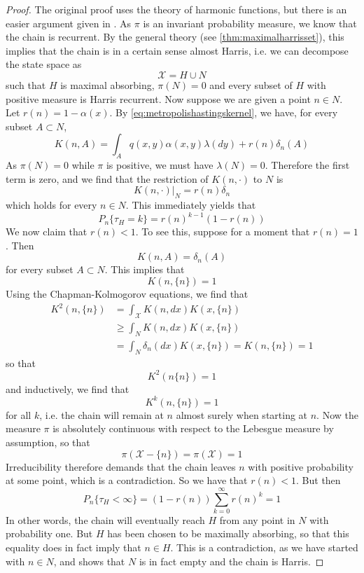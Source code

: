 \documentclass[a4paper, draft]{article}
\theoremstyle{own}
\theoremstyle{remark}
\begin{document}
\begin{proof}
	The original proof uses the theory of harmonic functions, but there is an easier argument given in \cite{RobertsRosenthal2006}. As $\pi$ is an invariant probability measure, we know that the chain is recurrent. By the general theory (see \ref{thm:maximalharrisset}), this implies that the chain is in a certain sense almost Harris, i.e. we can decompose the state space as
	$$
	{\mathcal X} = H \cup N
	$$
	such that $H$ is maximal absorbing, $\pi(N) = 0$ and  every subset of $H$ with positive measure is Harris recurrent. Now suppose we are given a point $n \in N$. Let $r(n) = 1 - \alpha(x)$. By \eqref{eq:metropolishastingskernel}, we have, for every subset $A \subset N$,
	$$
	K(n, A) = \int_A q(x,y) \alpha(x,y) \lambda(dy) + r(n) \delta_n(A)
	$$
	As $\pi(N) = 0$ while $\pi$ is positive, we must have $\lambda(N) = 0$. Therefore the first term is zero, and we find that the restriction of $K(n,\cdot)$ to $N$ is
	$$
	K(n, \cdot) |_N = r(n) \delta_n
	$$
	which holds for every $n \in N$. 
	This immediately yields that
	$$
	P_n\{ \tau_H = k \} = r(n)^{k-1} (1 - r(n))
	$$
	We now claim that $r(n) < 1$. To see this, suppose for a moment that $r(n) = 1$. Then
	$$
	K(n,A) = \delta_n(A)
	$$
	for every subset $A \subset N$. This implies that
	$$
	K(n, \{ n\}) = 1
	$$
	Using the Chapman-Kolmogorov equations, we find that
	\begin{align*}
	K^2(n, \{ n \} )  & = \int_{\mathcal X} K(n, dx) K(x, \{ n \} )  \\
	& \geq \int_{N} K(n, dx) K(x, \{ n \}) \\
	&= \int_{N} \delta_n(dx) K(x, \{ n \}) = K(n, \{ n \}) = 1
	\end{align*}
	so that
	$$
	K^2(n \{n \}) = 1
	$$
	and inductively, we find that
	$$
	K^k (n, \{ n \}) = 1
	$$
	for all $k$, i.e. the chain will remain at $n$ almost surely when starting at $n$. Now the measure $\pi$ is absolutely continuous with respect to the Lebesgue measure by assumption, so that
	$$
	\pi({\mathcal X} - \{ n \}) = \pi({\mathcal X}) = 1
	$$
	Irreducibility therefore demands that the chain leaves $n$ with positive probability at some point, which is a contradiction. So we have that $r(n) < 1$. But then
	$$
	P_n \{ \tau_H < \infty\} = (1 - r(n)) \sum_{k=0}^\infty r(n)^k = 1 
	$$
	In other words, the chain will eventually reach $H$ from any point in $N$ with probability one. But $H$ has been chosen to be maximally absorbing, so that this equality does in fact imply that $n \in H$. This is a contradiction, as we have started with $n \in N$, and shows that $N$ is in fact empty and the chain is Harris.
\end{proof}
\end{document}

